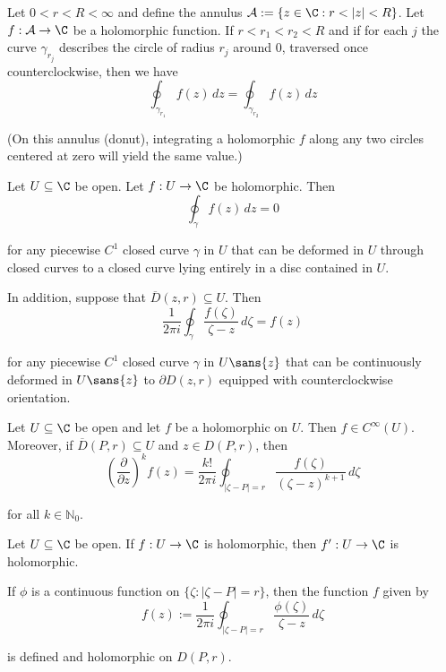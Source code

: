 \label{ecbc559}

Let $0<r<R<\infty$ and define the annulus $\mathcal A:=\{z\in\C:r<|z|<R\}$. Let
$f:\mathcal A\to\C$ be a holomorphic function. If $r<r_1<r_2<R$ and if for each
$j$ the curve $\gamma_{r_j}$ describes the circle of radius $r_j$ around 0,
traversed once counterclockwise, then we have
$$
  \oint_{\gamma_{r_1}}f(z)\,dz=\oint_{\gamma_{r_2}}f(z)\,dz
$$

(On this annulus (donut), integrating a holomorphic $f$ along any two
circles centered at zero will yield the same value.)

\label{be5c80c}

Let $U\subseteq\C$ be open. Let $f:U\to\C$ be holomorphic. Then
$$\oint_\gamma f(z)\,dz=0$$

for any piecewise $C^1$ closed curve $\gamma$ in $U$ that can be deformed in
$U$ through closed curves to a closed curve lying entirely in a disc contained
in $U$.

In addition, suppose that $\overline D(z,r)\subseteq U$. Then
$$
  \frac1{2\pi i}\oint_\gamma\frac{f(\zeta)}{\zeta-z}\,d\zeta=f(z)
$$

for any piecewise $C^1$ closed curve $\gamma$ in $U\sans{z}$ that can be
continuously deformed in $U\sans{z}$ to $\partial D(z,r)$ equipped with
counterclockwise orientation.

\label{e20a4ed}

Let $U\subseteq\C$ be open and let $f$ be a holomorphic on $U$. Then $f\in
C^\infty(U)$. Moreover, if $\overline D(P,r)\subseteq U$ and $z\in D(P,r)$,
then
$$
  \left(\frac\partial{\partial z}\right)^kf(z)=\frac{k!}{2\pi i}
  \oint_{|\zeta-P|=r}\frac{f(\zeta)}{(\zeta-z)^{k+1}}\,d\zeta
$$

for all $k\in\mathbb{N}_0$.

\label{ee189cf}

Let $U\subseteq\C$ be open. If $f:U\to\C$ is holomorphic, then $f':U\to\C$ is
holomorphic.

\label{c056da0}

If $\phi$ is a continuous function on $\{\zeta:|\zeta-P|=r\}$, then the
function $f$ given by
$$
  f(z):=\frac1{2\pi i}\oint_{|\zeta-P|=r}\frac{\phi(\zeta)}{\zeta-z}\,d\zeta
$$

is defined and holomorphic on $D(P,r)$.

